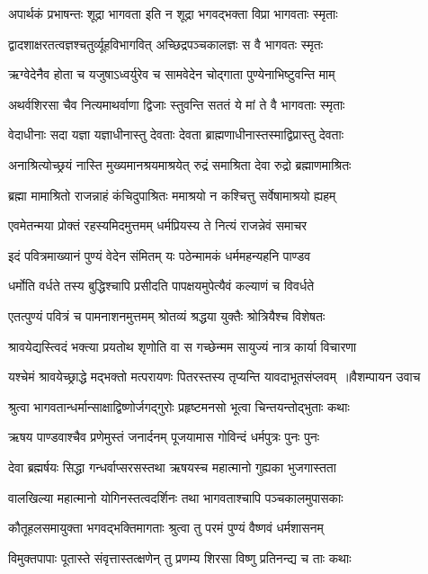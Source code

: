 \twolineshloka
{अपार्थकं प्रभाषन्तः शूद्रा भागवता इति}
{न शूद्रा भगवद्भक्ता विप्रा भागवताः स्मृताः}


\twolineshloka
{द्वादशाक्षरतत्वज्ञश्चतुर्व्यूहविभागवित्}
{अच्छिद्रपञ्चकालज्ञः स वै भागवतः स्मृतः}


\twolineshloka
{ऋग्वेदेनैव होता च यजुषाऽध्वर्युरेव च}
{सामवेदेन चोद्गाता पुण्येनाभिष्टुवन्ति माम्}


\twolineshloka
{अथर्वशिरसा चैव नित्यमाथर्वाणा द्विजाः}
{स्तुवन्ति सततं ये मां ते वै भागवताः स्मृताः}


\twolineshloka
{वेदाधीनाः सदा यज्ञा यज्ञाधीनास्तु देवताः}
{देवता ब्राह्मणाधीनास्तस्माद्विप्रास्तु देवताः}


\twolineshloka
{अनाश्रित्योच्छ्रयं नास्ति मुख्यमानश्रयमाश्रयेत्}
{रुद्रं समाश्रिता देवा रुद्रो ब्रह्माणमाश्रितः}


\twolineshloka
{ब्रह्मा मामाश्रितो राजन्नाहं कंचिदुपाश्रितः}
{ममाश्रयो न कश्चित्तु सर्वेषामाश्रयो ह्यहम्}


\twolineshloka
{एवमेतन्मया प्रोक्तं रहस्यमिदमुत्तमम्}
{धर्मप्रियस्य ते नित्यं राजन्नेवं समाचर}


\twolineshloka
{इदं पवित्रमाख्यानं पुण्यं वेदेन संमितम्}
{यः पठेन्मामकं धर्ममहन्यहनि पाण्डव}


\twolineshloka
{धर्मोति वर्धते तस्य बुद्धिश्चापि प्रसीदति}
{पापक्षयमुपेत्यैवं कल्याणं च विवर्धते}


\twolineshloka
{एतत्पुण्यं पवित्रं च पामनाशनमुत्तमम्}
{श्रोतव्यं श्रद्धया युक्तैः श्रोत्रियैश्च विशेषतः}


\twolineshloka
{श्रावयेद्यस्त्विदं भक्त्या प्रयतोथ शृणोति वा}
{स गच्छेन्मम सायुज्यं नात्र कार्या विचारणा}


\threelineshloka
{यश्चेमं श्रावयेच्छ्राद्धे मद्भक्तो मत्परायणः}
{पितरस्तस्य तृप्यन्ति यावदाभूतसंप्लवम् ॥वैशम्पायन उवाच}
{}


\twolineshloka
{श्रुत्वा भागवतान्धर्मान्साक्षाद्विष्णोर्जगद्गुरोः}
{प्रहृष्टमनसो भूत्वा चिन्तयन्तोद्भुताः कथाः}


\twolineshloka
{ऋषय पाण्डवाश्चैव प्रणेमुस्तं जनार्दनम्}
{पूजयामास गोविन्दं धर्मपुत्रः पुनः पुनः}


\twolineshloka
{देवा ब्रह्मर्षयः सिद्धा गन्धर्वाप्सरसस्तथा}
{ऋषयस्च महात्मानो गुह्यका भुजगास्तता}


\twolineshloka
{वालखिल्या महात्मानो योगिनस्तत्वदर्शिनः}
{तथा भागवताश्चापि पञ्चकालमुपासकाः}


\twolineshloka
{कौतूहलसमायुक्ता भगवद्भक्तिमागताः}
{श्रुत्वा तु परमं पुण्यं वैष्णवं धर्मशासनम्}


\twolineshloka
{विमुक्तपापाः पूतास्ते संवृत्तास्तत्क्षणेन् तु}
{प्रणम्य शिरसा विष्णु प्रतिनन्द्य च ताः कथाः}


